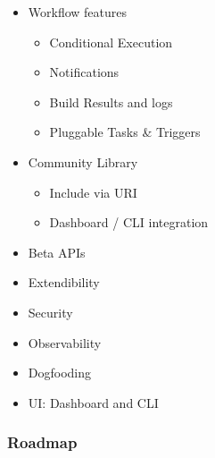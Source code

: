 \documentclass[aspectratio=169,11pt,hyperref={colorlinks=true}]{beamer}
\begin{document}
\begin{lblackrwhiteframe}
\begin{lblackrwhiteframe}
\begin{blackframe}
\begin{whiteframe}
\begin{2columnsframe}
  {
    \begin{itemize}
      \item Workflow features
      \begin{itemize}
        \item Conditional Execution
        \item Notifications
        \item Build Results and logs
        \item Pluggable Tasks \& Triggers
      \end{itemize}
      \item Community Library
      \begin{itemize}
        \item Include via URI
        \item Dashboard / CLI integration
      \end{itemize}
    \end{itemize}
  }
  {
    \begin{itemize}
      \item Beta APIs
      \item Extendibility
      \item Security
      \item Observability
      \item Dogfooding
      \item UI: Dashboard and CLI
    \end{itemize}
  }
  \frametitle{Roadmap}
\end{2columnsframe}


\end{whiteframe}
\end{blackframe}
\end{lblackrwhiteframe}
\end{lblackrwhiteframe}
\end{document}
